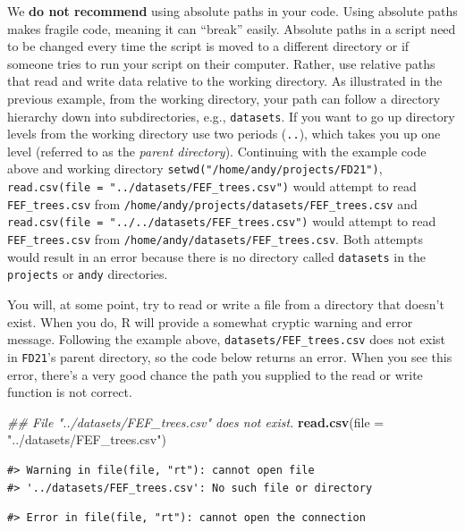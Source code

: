 \documentclass[
  11pt,
]{krantz}
\newenvironment{Shaded}{\begin{snugshade}}{\end{snugshade}}
\newcommand{\CommentTok}[1]{\textcolor[rgb]{0.56,0.35,0.01}{\textit{#1}}}
\newcommand{\DataTypeTok}[1]{\textcolor[rgb]{0.13,0.29,0.53}{#1}}
\newcommand{\KeywordTok}[1]{\textcolor[rgb]{0.13,0.29,0.53}{\textbf{#1}}}
\newcommand{\NormalTok}[1]{#1}
\newcommand{\StringTok}[1]{\textcolor[rgb]{0.31,0.60,0.02}{#1}}
\theoremstyle{definition}
\theoremstyle{definition}
\theoremstyle{definition}
\theoremstyle{definition}
\theoremstyle{remark}
\begin{document}
We \textbf{do not recommend} using absolute paths in your code. Using absolute paths makes fragile code, meaning it can ``break'' easily. Absolute paths in a script need to be changed every time the script is moved to a different directory or if someone tries to run your script on their computer. Rather, use relative paths that read and write data relative to the working directory. As illustrated in the previous example, from the working directory, your path can follow a directory hierarchy down into subdirectories, e.g., \texttt{datasets}. If you want to go up directory levels from the working directory use two periods (\texttt{..}), which takes you up one level (referred to as the \emph{parent directory}). Continuing with the example code above and working directory \texttt{setwd("/home/andy/projects/FD21")}, \texttt{read.csv(file\ =\ "../datasets/FEF\_trees.csv")} would attempt to read \texttt{FEF\_trees.csv} from \texttt{/home/andy/projects/datasets/FEF\_trees.csv} and \texttt{read.csv(file\ =\ "../../datasets/FEF\_trees.csv")} would attempt to read \texttt{FEF\_trees.csv} from \texttt{/home/andy/datasets/FEF\_trees.csv}. Both attempts would result in an error because there is no directory called \texttt{datasets} in the \texttt{projects} or \texttt{andy} directories.

You will, at some point, try to read or write a file from a directory that doesn't exist. When you do, R will provide a somewhat cryptic warning and error message. Following the example above, \texttt{datasets/FEF\_trees.csv} does not exist in \texttt{FD21}'s parent directory, so the code below returns an error. When you see this error, there's a very good chance the path you supplied to the read or write function is not correct.

\begin{Shaded}
\begin{Highlighting}[]
\CommentTok{\#\# File "../datasets/FEF\_trees.csv" does not exist.}
\KeywordTok{read.csv}\NormalTok{(}\DataTypeTok{file =} \StringTok{"../datasets/FEF\_trees.csv"}\NormalTok{)}
\end{Highlighting}
\end{Shaded}

\begin{verbatim}
#> Warning in file(file, "rt"): cannot open file
#> '../datasets/FEF_trees.csv': No such file or directory
\end{verbatim}

\begin{verbatim}
#> Error in file(file, "rt"): cannot open the connection
\end{verbatim}
\end{document}
